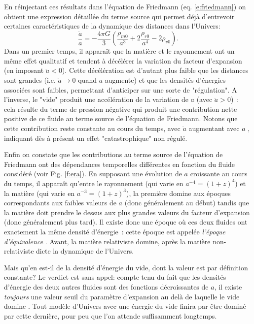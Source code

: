 En réinjectant ces résultats dans l'équation de Friedmann (eq. \ref{e:friedmann})  on obtient une expression détaillée du terme source qui permet déjà d'entrevoir certaines caractéristiques de la dynamique des distances dans l'Univers:
\begin{equation}
\frac{\ddot a}{a}=-\frac{4\pi G}{3}(\frac{\rho_{m0}}{a^3}+2\frac{\rho_{r0}}{a^4}-2\rho_{v0}).
\label{e:esource}
\end{equation}
Dans un premier temps, il apparaît que la matière et le rayonnement ont un même effet qualitatif et tendent à décélérer la variation du facteur d'expansion (en imposant $\ddot a<0$). Cette décélération est d'autant plus faible que les distances  sont grandes (i.e. $\ddot a \rightarrow 0$ quand $a$ augmente) et que les densités d'énergies associées sont faibles, permettant d'anticiper sur une sorte de "régulation". A l'inverse, le "vide" produit une accélération de la variation de $a$ (avec $\ddot a>0$)~: cela résulte du terme de pression négative qui produit une contribution nette positive de ce fluide au terme source de l'équation de Friedmann. Notons que cette contribution reste constante au cours du temps, avec $\ddot a$ augmentant avec $a$ , indiquant dès à présent un effet "catastrophique" non régulé. 

Enfin on constate que les contributions au terme source de l'équation de Friedmann ont des dépendances temporelles différentes en fonction du fluide considéré (voir Fig. \ref{f:era}). En supposant une évolution de $a$ croissante au cours du temps, il apparaît qu'entre le rayonnement (qui varie en $a^{-4}=(1+z)^4$) et la matière (qui varie en $a^{-3}=(1+z)^3$), la première domine aux époques correspondants aux faibles valeurs de $a$ (donc généralement au début) tandis que la matière doit prendre le dessus aux plus grandes valeurs du facteur d'expansion (donc généralement plus tard). Il existe donc une époque où ces deux fluides ont exactement la même densité d'énergie~: cette époque est appelée \textit{l'époque d'équivalence} . Avant, la matière relativiste domine, après la matière non-relativiste dicte la dynamique de l'Univers.

Mais qu'en est-il de la densité d'énergie du vide, dont la valeur est par définition constante? Le verdict est sans appel: compte tenu du fait que les densités d'énergie des deux autres fluides sont des fonctions décroissantes de $a$, il existe \textit{toujours} une valeur seuil du paramètre d'expansion au delà de laquelle le vide domine . Tout modèle d'Univers avec une énergie du vide finira par être dominé par cette dernière, pour peu que l'on attende suffisamment longtemps.

